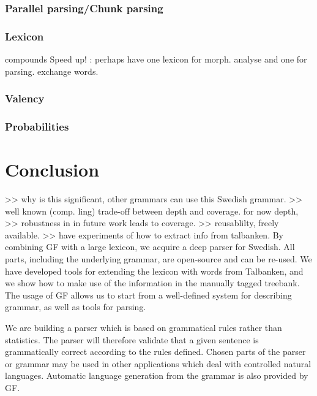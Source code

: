 \documentclass{report}
\begin{document}
\subsubsection{Parallel parsing/Chunk parsing}
\subsubsection{Lexicon}
compounds
Speed up! : perhaps have one lexicon for morph. analyse and one for parsing.
exchange words.
\subsubsection{Valency}
\label{sec:futureValency}

\subsubsection{Probabilities}
\label{sec:futureProbabilities}





\section{Conclusion}
>> why is this significant, other grammars can use this Swedish grammar.
>> well known (comp. ling) trade-off between depth and coverage. for now depth,
>> robustness in in future work leads to coverage.
>> reusablilty, freely available.
>> have experiments of how to extract info from talbanken.
By combining GF with a large lexicon, we acquire a deep parser for 
Swedish. All parts, including the underlying grammar, are open-source and can be re-used.
We have developed tools for extending the lexicon with words from Talbanken,
and we show how to make use of the information in the manually tagged
treebank.
The usage of GF allows us to start from
a well-defined system for describing grammar, as well as tools for
parsing.


We are building a parser which is based on grammatical rules rather than
statistics. The parser will therefore validate that
a given sentence is grammatically correct according to the rules defined.
Chosen parts of the parser or grammar may be used in other applications
which deal with controlled natural languages. Automatic language
generation from the grammar is also provided by GF.
\end{document}

